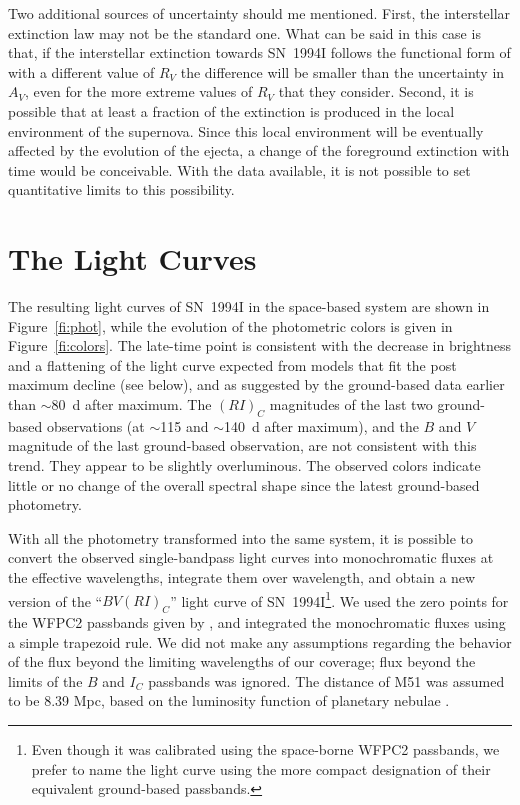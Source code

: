 \documentclass[12pt,manuscript]{aastex}
\begin{document}
Two additional sources of uncertainty should me mentioned. First, the
interstellar extinction law may not be the standard one.
%
What can be said in this case is that, if the interstellar extinction towards
SN~1994I follows the functional form of \citet{ccm89} with a different value of
$R_V$ the difference will be smaller than the uncertainty in $A_V$, even for the
more extreme values of $R_V$ that they consider.
%
Second, it is possible that at least a fraction of the extinction is produced in the
local environment of the supernova. Since this local environment will be
eventually affected by the evolution of the ejecta, a change of the foreground
extinction with time would be conceivable. With the data available, it is not
possible to set quantitative limits to this possibility.

\section{The Light Curves} \label{se:lcurves}

The resulting light curves of SN~1994I in the space-based system 
are shown in Figure~\ref{fi:phot}, while the evolution of the photometric
colors is given in Figure~\ref{fi:colors}.
%
The late-time point is consistent with the decrease in brightness and
a flattening of the light curve expected from models that fit the post maximum decline (see below), and as suggested by the ground-based data earlier than $\sim$80~d after maximum.
%
The $(RI)_C$ magnitudes of the last two ground-based observations
(at $\sim$115 and $\sim$140~d after maximum), and the $B$ and 
$V$ magnitude of the last ground-based observation,
are not consistent with this trend.
%
They appear to be slightly overluminous.
%
The observed colors indicate little or no change of the overall spectral shape since
the latest ground-based photometry.

With all the photometry transformed into the same system, it is 
possible to convert the observed single-bandpass light curves into
monochromatic fluxes at the effective wavelengths, integrate 
them over wavelength, and obtain a new version
of the ``$BV(RI)_C$'' light curve of SN~1994I\footnote{Even 
though it was calibrated using the space-borne WFPC2
passbands, we prefer to name the light curve using the more 
compact designation of their equivalent ground-based passbands.}.
%
We used the zero points for the WFPC2 passbands given by 
\citet{hol95}, and integrated the monochromatic fluxes using a
simple trapezoid rule.
%
We did not make any assumptions regarding the behavior of the flux 
beyond the limiting wavelengths of our coverage;
flux beyond the limits of the $B$ and $I_C$ passbands was ignored.
%
The distance of M51 was assumed to be 8.39 Mpc, based on the 
luminosity function of planetary nebulae \citep{fcj97}.
\end{document}
